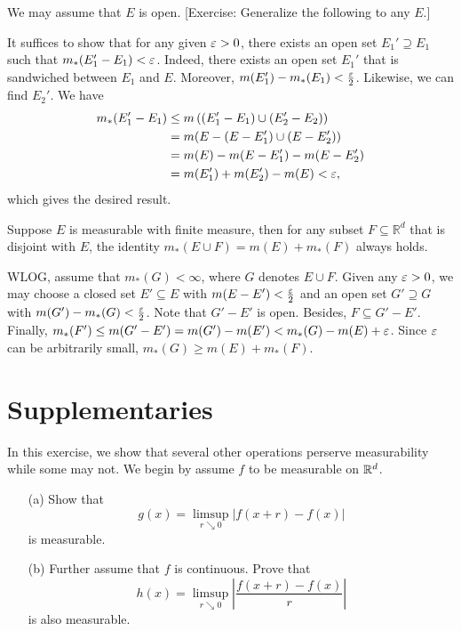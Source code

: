 \begin{Solution}
  We may assume that $E$ is open. [Exercise: Generalize the following to any $E$.]

  It suffices to show that for any given $\varepsilon>0$, there exists an open set $E_1'\supseteq E_1$ such that $m_*(E_1'-E_1)<\varepsilon$.
  Indeed, there exists an open set $E_1'$ that is sandwiched between $E_1$ and $E$. Moreover, $m(E_1')-m_*(E_1)<\frac{\varepsilon}2$. Likewise, we can find $E_2'$. We have
  \begin{align*}
  m_*(E_1'-E_1)&\leq m\left((E_1'-E_1)\cup(E_2'-E_2)\right)\\
  &=m(E-(E-E_1')\cup(E-E_2'))\\
  &=m(E)-m(E-E_1')-m(E-E_2')\\
  &=m(E_1')+m(E_2')-m(E)<\varepsilon,
  \end{align*}
  which gives the desired result.
\end{Solution}

\begin{Problem}[5']
	Suppose $E$ is measurable with finite measure, then for any subset $F\subseteq\mathbb{R}^d$ that is disjoint with $E$, the identity $m_*(E\cup F)=m(E)+m_*(F)$ always holds.
\end{Problem}

\begin{Solution}
  WLOG, assume that $m_*(G)<\infty$, where $G$ denotes $E\cup F$. Given any $\varepsilon>0$, we may choose a closed set $E'\subseteq E$ with $m(E-E')<\frac{\varepsilon}{2}$ and an open set $G'\supseteq G$ with $m(G')-m_*(G)<\frac{\varepsilon}{2}$.
  Note that $G'-E'$ is open. Besides, $F\subseteq G'-E'$. Finally, $m_*(F')\leq m(G'-E')=m(G')-m(E')<m_*(G)-m(E)+\varepsilon$. Since $\varepsilon$ can be arbitrarily small, $m_*(G)\geq m(E)+m_*(F)$.
\end{Solution}

\section{Supplementaries}

\begin{Exercise}[a]
  In this exercise, we show that several other operations perserve measurability while some may not.
  We begin by assume $f$ to be measurable on $\mathbb{R}^d$.
  \begin{itemize}
    \item [(a)] Show that
    $$
    g(x)=\limsup_{r\searrow0}|f(x+r)-f(x)|
    $$
    is measurable.
    \item [(b)] Further assume that $f$ is continuous. Prove that
    $$
    h(x)=\limsup_{r\searrow0}\left|\frac{f(x+r)-f(x)}{r}\right|
    $$
    is also measurable.
  \end{itemize}
\end{Exercise}


